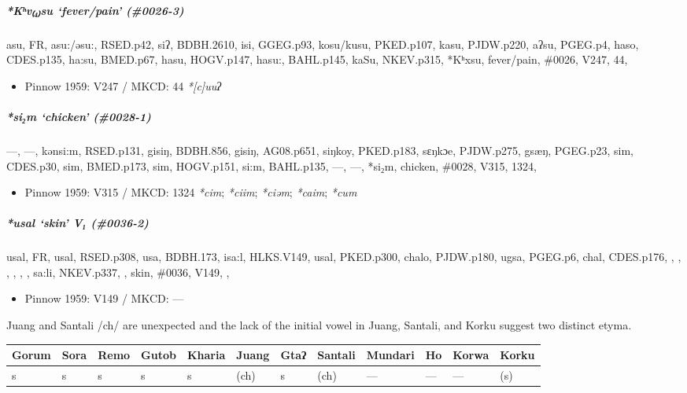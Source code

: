 \documentclass[a4paper,]{article}
\providecommand{\tightlist}{%
  \setlength{\itemsep}{0pt}\setlength{\parskip}{0pt}}
\let\oldsubparagraph\subparagraph
\renewcommand{\subparagraph}[1]{\oldsubparagraph{#1}\mbox{}}
\begin{document}
\subparagraph{\texorpdfstring{\emph{*Kʰv₍₄₎su} `fever/pain'
(\#0026-3)}{*Kʰv₍₄₎su fever/pain (\#0026-3)}}\label{kux2b0vsu-feverpain-0026-3}

asu, FR, asu:/əsu:, RSED.p42, siʔ, BDBH.2610, isi, GGEG.p93, kosu/kusu,
PKED.p107, kasu, PJDW.p220, aʔsu, PGEG.p4, haso, CDES.p135, ha:su,
BMED.p67, hasu, HOGV.p147, hasu:, BAHL.p145, kaSu, NKEV.p315, *Kʰxsu,
fever/pain, \#0026, V247, 44,

\begin{itemize}
\tightlist
\item
  Pinnow 1959: V247 / MKCD: 44 \emph{*{[}c{]}uuʔ}
\end{itemize}

\subparagraph{\texorpdfstring{\emph{*si₂m} `chicken'
(\#0028-1)}{*si₂m chicken (\#0028-1)}}\label{sim-chicken-0028-1}

---, ---, kənsi:m, RSED.p131, gisiŋ, BDBH.856, gisiŋ, AG08.p651, siŋkoy,
PKED.p183, sɛŋkɔe, PJDW.p275, gsæŋ, PGEG.p23, sim, CDES.p30, sim,
BMED.p173, sim, HOGV.p151, si:m, BAHL.p135, ---, ---, *si₂m, chicken,
\#0028, V315, 1324,

\begin{itemize}
\tightlist
\item
  Pinnow 1959: V315 / MKCD: 1324 \emph{*cim}; \emph{*ciim};
  \emph{*ciəm}; \emph{*caim}; \emph{*cum}
\end{itemize}

\subparagraph{\texorpdfstring{\emph{*usal} `skin' V₁
(\#0036-2)}{*usal skin V₁ (\#0036-2)}}\label{usal-skin-v-0036-2}

usal, FR, usal, RSED.p308, usa, BDBH.173, isa:l, HLKS.V149, usal,
PKED.p300, chalo, PJDW.p180, ugsa, PGEG.p6, chal, CDES.p176, , , , , , ,
sa:li, NKEV.p337, , skin, \#0036, V149, ,

\begin{itemize}
\tightlist
\item
  Pinnow 1959: V149 / MKCD: ---
\end{itemize}

Juang and Santali /ch/ are unexpected and the lack of the initial vowel
in Juang, Santali, and Korku suggest two distinct etyma.

\begin{longtable}[]{@{}llllllllllll@{}}
\toprule
Gorum & Sora & Remo & Gutob & Kharia & Juang & Gtaʔ & Santali & Mundari
& Ho & Korwa & Korku\tabularnewline
\midrule
\endhead
s & s & s & s & s & (ch) & s & (ch) & --- & --- & --- &
(s)\tabularnewline
\bottomrule
\end{longtable}
\end{document}
